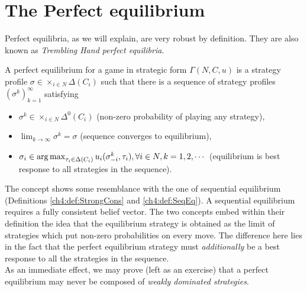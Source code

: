 \section{The Perfect equilibrium}

Perfect equilibria, as we will explain, are very robust by definition. They are also known as \emph{Trembling Hand perfect equilibria}.\\
\begin{definition}
A perfect equilibrium for a game in strategic form $\Gamma(N,C,u)$ is a strategy profile $\sigma \in \times_{i \in N} \Delta (C_i)$ such that there is a sequence of strategy profiles $ (\sigma^k)_{k = 1}^\infty$ satisfying
\begin{itemize}
\item $\sigma^k \in \times_{i \in N} \Delta^0 (C_i)$ (non-zero probability of playing any strategy),
\item $\lim_{k \rightarrow \infty} \sigma^k = \sigma$ (sequence converges to equilibrium),
\item $ \sigma_i \in \operatorname*{arg\,max}_{\tau_i \in \Delta(C_i)}u_i(\sigma^k_{-i}, \tau_i), \forall i \in N, k = 1,2, \cdots $ (equilibrium is best response to all strategies in the sequence).
\end{itemize}
\label{ch5:def:perfectEq}
\end{definition}
The concept shows some resemblance with the one of sequential equilibrium (Definitions \ref{ch4:def:StrongCons} and \ref{ch4:def:SeqEq}). A sequential equilibrium requires a fully consistent belief vector. The two concepts embed within their definition the idea that the equilibrium strategy is obtained as the limit of strategies which put non-zero probabilities on every move. The difference here lies in the fact that the perfect equilibrium strategy must \emph{additionally} be a best response to all the strategies in the sequence. \\
As an immediate effect, we may prove (left as an exercise) that a perfect equilibrium may never be composed of \emph{weakly dominated strategies}.

